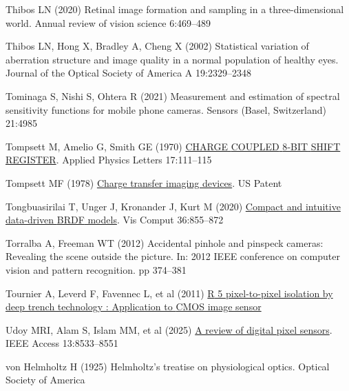 \documentclass[
  letterpaper,
]{book}
\newlength{\cslhangindent}
\newenvironment{CSLReferences}[2] %
 {\begin{list}{}{%
  \setlength{\itemindent}{0pt}
  \setlength{\leftmargin}{0pt}
  \setlength{\parsep}{0pt}
  \ifodd #1
   \setlength{\leftmargin}{\cslhangindent}
   \setlength{\itemindent}{-1\cslhangindent}
  \fi
  \setlength{\itemsep}{#2\baselineskip}}}
 {\end{list}}
\begin{document}
\begin{CSLReferences}{1}{1}
Thibos LN (2020) Retinal image formation and sampling in a
three-dimensional world. Annual review of vision science 6:469--489

Thibos LN, Hong X, Bradley A, Cheng X (2002) Statistical variation of
aberration structure and image quality in a normal population of healthy
eyes. Journal of the Optical Society of America A 19:2329--2348

Tominaga S, Nishi S, Ohtera R (2021) Measurement and estimation of
spectral sensitivity functions for mobile phone cameras. Sensors (Basel,
Switzerland) 21:4985

Tompsett M, Amelio G, Smith GE (1970)
\href{https://pubs.aip.org/aip/apl/article/17/3/111/42008}{{CHARGE}
{COUPLED} {8‐BIT} {SHIFT} {REGISTER}}. Applied Physics Letters
17:111--115

Tompsett MF (1978)
\href{https://patents.google.com/patent/US4085456}{Charge transfer
imaging devices}. US Patent

Tongbuasirilai T, Unger J, Kronander J, Kurt M (2020)
\href{https://link.springer.com/article/10.1007/s00371-019-01664-z}{Compact
and intuitive data-driven {BRDF} models}. Vis Comput 36:855--872

Torralba A, Freeman WT (2012) Accidental pinhole and pinspeck cameras:
{Revealing} the scene outside the picture. In: 2012 {IEEE} conference on
computer vision and pattern recognition. pp 374--381

Tournier A, Leverd F, Favennec L, et al (2011)
\href{https://www.imagesensors.org/Past\%20Workshops/2011\%20Workshop/2011\%20Papers/R05_Tournier_Isolation.pdf}{{R}
5 pixel-to-pixel isolation by deep trench technology : Application to
{CMOS} image sensor}

Udoy MRI, Alam S, Islam MM, et al (2025)
\href{http://dx.doi.org/10.1109/ACCESS.2025.3526879}{A review of digital
pixel sensors}. IEEE Access 13:8533--8551

von Helmholtz H (1925) Helmholtz's treatise on physiological optics.
Optical Society of America


\end{CSLReferences}
\end{document}
